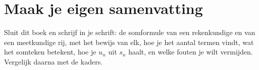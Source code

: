 \ifzelfstudie
\section*{Maak je eigen samenvatting}
Sluit dit boek en schrijf in je schrift: de somformule van een rekenkundige en van een meetkundige rij, met het bewijs van elk, hoe je het aantal termen vindt, wat het somteken betekent, hoe je $u_n$ uit $s_n$ haalt, en welke fouten je wilt vermijden. Vergelijk daarna met de kaders.
\fi
